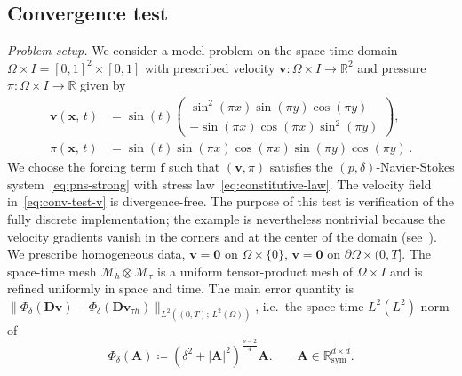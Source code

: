 \documentclass[DIV=16]{scrartcl}
\newcommand{\uu}{\boldsymbol v}
\newcommand{\ff}{\boldsymbol f}
\newcommand{\DD}{\boldsymbol D} %
\newcommand{\It}{I}
\newcommand{\Th}{\mathcal M_h}
\newcommand{\reg}{\delta}
\newcommand{\pn}{p}
\begin{document}
\subsection{\label{sec:conv-ns}Convergence test}
\emph{Problem setup.} We consider a model problem on the space-time domain $\Omega\times \It = {[0,1]}^2\times [0,1]$ with prescribed velocity
$\uu \colon \Omega\times \It \to \mathbb{R}^2$ and pressure
$\pi \colon \Omega\times \It \to \mathbb{R}$ given by
\begin{subequations}\label{eq:conv-test}
  \begin{align}
    \label{eq:conv-test-v}
    \uu(\mathbf{x},\,t) &= \sin(t) \begin{pmatrix} \sin^2(\pi x) \sin(\pi y) \cos(\pi y) \\
      -\sin(\pi x) \cos(\pi x) \sin^2(\pi y) \end{pmatrix},\\
    \label{eq:conv-test-p} \pi(\mathbf{x},\,t) &= \sin(t) \sin(\pi x) \cos(\pi x)
                                               \sin(\pi y) \cos(\pi y)\,.
  \end{align}
\end{subequations}
We choose the forcing term $\ff$ such that $(\uu,\pi)$ satisfies the
$(\pn,\reg)$-Navier-Stokes system~\eqref{eq:pns-strong} with stress
law~\eqref{eq:constitutive-law}. The velocity field in~\eqref{eq:conv-test-v} is
divergence-free. The purpose of this test is verification of the fully discrete
implementation; the example is nevertheless nontrivial because the velocity
gradients vanish in the corners and at the center of the domain (see~). We prescribe
homogeneous data, \(\uu=\bm 0 \text{ on }\Omega\times \{0\}\),
\(\uu=\bm 0 \text{ on } \partial \Omega\times (0, T]\). The space-time mesh
$\Th\otimes\mathcal{M}_{\tau}$ is a uniform tensor-product mesh of
$\Omega\times \It$ and is refined uniformly in space and time. The main error quantity is
$\|\Phi_\reg(\DD\uu)-\Phi_\reg(\DD\uu_{\tau h})\|_{L^2((0,T);\,L^2(\Omega))}$,
i.e.\ the space-time $L^2(L^2)$-norm of
\begin{equation}\label{eq:nat-dist}
  \Phi_\reg(\bm A)\coloneq {(\reg^2+|\bm A|^2)}^{\frac{\pn-2}{4}}\bm A.
  \qquad \bm A\in\mathbb{R}^{d\times d}_{\mathrm{sym}}.
\end{equation}
\end{document}
